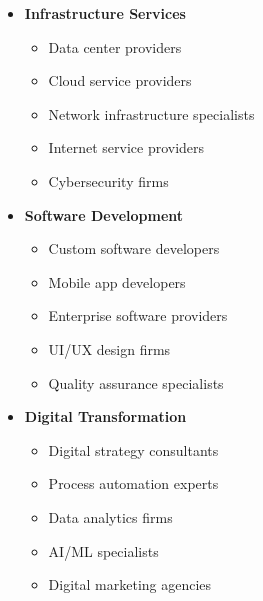 \begin{tcolorbox}[
    colback=white,
    colframe=primarydark,
    title=\textbf{Technology Service Providers},
    before skip=1em,
    after skip=1em
]
    \begin{itemize}[leftmargin=*,itemsep=0.5em]
        \item \textbf{Infrastructure Services}
        \begin{itemize}[itemsep=0.3em]
            \item Data center providers
            \item Cloud service providers
            \item Network infrastructure specialists
            \item Internet service providers
            \item Cybersecurity firms
        \end{itemize}

        \vspace{0.5em}

        \item \textbf{Software Development}
        \begin{itemize}[itemsep=0.3em]
            \item Custom software developers
            \item Mobile app developers
            \item Enterprise software providers
            \item UI/UX design firms
            \item Quality assurance specialists
        \end{itemize}

        \vspace{0.5em}

        \item \textbf{Digital Transformation}
        \begin{itemize}[itemsep=0.3em]
            \item Digital strategy consultants
            \item Process automation experts
            \item Data analytics firms
            \item AI/ML specialists
            \item Digital marketing agencies
        \end{itemize}
    \end{itemize}
\end{tcolorbox}

